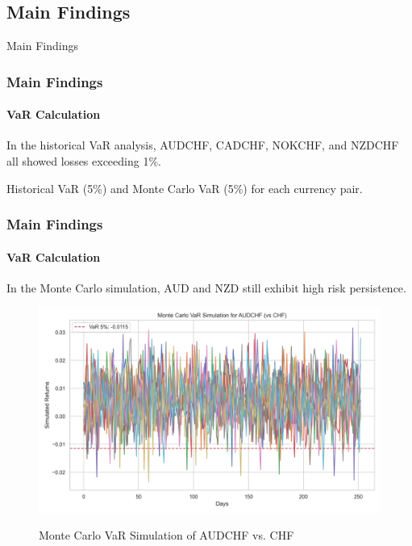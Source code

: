 \documentclass[10pt]{beamer}
\begin{document}
\begin{frame}
\section{Main Findings}
\centering \LARGE Main Findings
\end{frame}
\begin{frame}
\frametitle{Main Findings}
\framesubtitle{VaR Calculation}
In the historical VaR analysis, AUDCHF, CADCHF, NOKCHF, and NZDCHF all showed losses exceeding 1\%. 
\begin{table}[h]
\centering
\caption{\footnotesize Historical VaR (5\%) and Monte Carlo VaR (5\%) for each currency pair.} 
\label{tab:var_results}
\end{table}
\end{frame}
\begin{frame}
\frametitle{Main Findings}
\framesubtitle{VaR Calculation}
In the Monte Carlo simulation, AUD and NZD still exhibit high risk persistence.

\begin{figure}[h]
    \centering   \includegraphics[width=0.9\linewidth]{../../reports/figures/monte_carlo_var_simulation_AUDCHF_vs_CHF.png}  \label{fig:monte_carlo_var_simulation_AUDCHF_vs_CHF}
    
    \caption{\footnotesize Monte Carlo VaR Simulation of AUDCHF vs. CHF}  
\end{figure}
\end{frame}
\end{document}
